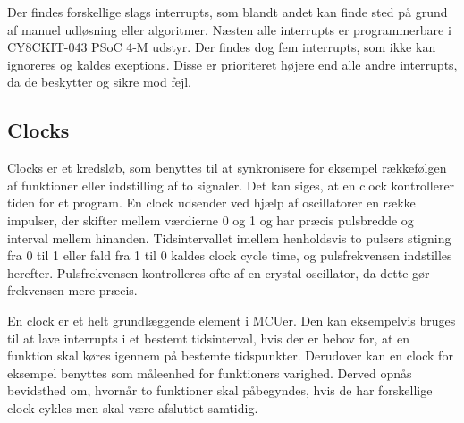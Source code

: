 Der findes forskellige slags interrupts, som blandt andet kan finde sted på grund af manuel udløsning eller algoritmer. Næsten alle interrupts er programmerbare i CY8CKIT-043 PSoC 4-M udstyr. Der findes dog fem interrupts, som ikke kan ignoreres og kaldes exeptions. Disse er prioriteret højere end alle andre interrupts, da de beskytter og sikre mod fejl. \citep{Badiger2016}

\subsection{Clocks}
Clocks er et kredsløb, som benyttes til at synkronisere for eksempel rækkefølgen af funktioner eller indstilling af to signaler. Det kan siges, at en clock kontrollerer tiden for et program. En clock udsender ved hjælp af oscillatorer en række impulser, der skifter mellem værdierne 0 og 1 og har præcis pulsbredde og interval mellem hinanden. Tidsintervallet imellem henholdsvis to pulsers stigning fra 0 til 1 eller fald fra 1 til 0 %
kaldes clock cycle time, og pulsfrekvensen indstilles herefter. Pulsfrekvensen kontrolleres ofte af en crystal oscillator, da dette gør frekvensen mere præcis. \citep{Tanenbaum2006}

En clock er et helt grundlæggende element i MCUer. Den kan eksempelvis bruges til at lave interrupts i et bestemt tidsinterval, hvis der er behov for, at en funktion skal køres igennem på bestemte tidspunkter. Derudover kan en clock for eksempel benyttes som måleenhed for funktioners varighed. Derved opnås bevidsthed om, hvornår to funktioner skal påbegyndes, hvis de har forskellige clock cykles men skal være afsluttet samtidig. \citep{Tanenbaum2006}

